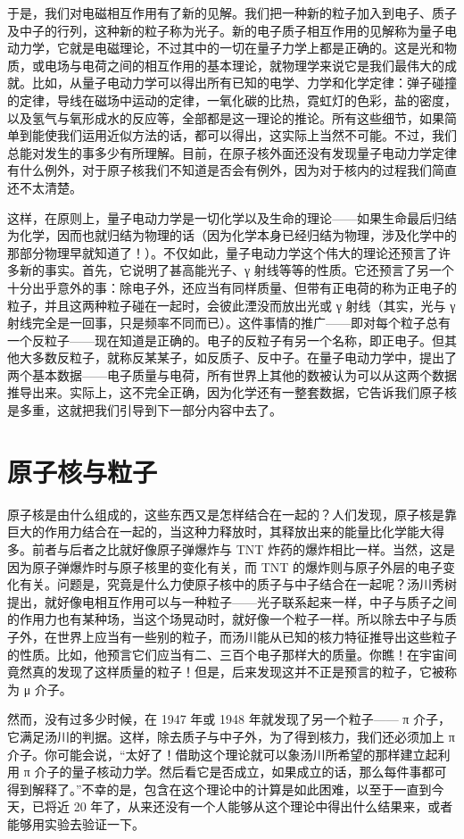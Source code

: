 \documentclass[11pt,oneside]{book}
\begin{document}
\begin{common-format}
于是，我们对电磁相互作用有了新的见解。我们把一种新的粒子加入到电子、质子及中子的行列，这种新的粒子称为光子。新的电子质子相互作用的见解称为量子电动力学，它就是电磁理论，不过其中的一切在量子力学上都是正确的。这是光和物质，或电场与电荷之间的相互作用的基本理论，就物理学来说它是我们最伟大的成就。比如，从量子电动力学可以得出所有已知的电学、力学和化学定律：弹子碰撞的定律，导线在磁场中运动的定律，一氧化碳的比热，霓虹灯的色彩，盐的密度，以及氢气与氧形成水的反应等，全部都是这一理论的推论。所有这些细节，如果简单到能使我们运用近似方法的话，都可以得出，这实际上当然不可能。不过，我们总能对发生的事多少有所理解。目前，在原子核外面还没有发现量子电动力学定律有什么例外，对于原子核我们不知道是否会有例外，因为对于核内的过程我们简直还不太清楚。

这样，在原则上，量子电动力学是一切化学以及生命的理论——如果生命最后归结为化学，因而也就归结为物理的话（因为化学本身已经归结为物理，涉及化学中的那部分物理早就知道了！）。不仅如此，量子电动力学这个伟大的理论还预言了许多新的事实。首先，它说明了甚高能光子、γ 射线等等的性质。它还预言了另一个十分出乎意外的事：除电子外，还应当有同样质量、但带有正电荷的称为正电子的粒子，并且这两种粒子碰在一起时，会彼此湮没而放出光或 γ 射线（其实，光与 γ 射线完全是一回事，只是频率不同而已）。这件事情的推广——即对每个粒子总有一个反粒子——现在知道是正确的。电子的反粒子有另一个名称，即正电子。但其他大多数反粒子，就称反某某子，如反质子、反中子。在量子电动力学中，提出了两个基本数据——电子质量与电荷，所有世界上其他的数被认为可以从这两个数据推导出来。实际上，这不完全正确，因为化学还有一整套数据，它告诉我们原子核是多重，这就把我们引导到下一部分内容中去了。


\section{原子核与粒子}
原子核是由什么组成的，这些东西又是怎样结合在一起的？人们发现，原子核是靠巨大的作用力结合在一起的，当这种力释放时，其释放出来的能量比化学能大得多。前者与后者之比就好像原子弹爆炸与 TNT 炸药的爆炸相比一样。当然，这是因为原子弹爆炸时与原子核里的变化有关，而 TNT 的爆炸则与原子外层的电子变化有关。问题是，究竟是什么力使原子核中的质子与中子结合在一起呢？汤川秀树提出，就好像电相互作用可以与一种粒子——光子联系起来一样，中子与质子之间的作用力也有某种场，当这个场晃动时，就好像一个粒子一样。所以除去中子与质子外，在世界上应当有一些别的粒子，而汤川能从已知的核力特征推导出这些粒子的性质。比如，他预言它们应当有二、三百个电子那样大的质量。你瞧！在宇宙间竟然真的发现了这样质量的粒子！但是，后来发现这并不正是预言的粒子，它被称为 μ 介子。

然而，没有过多少时候，在 1947 年或 1948 年就发现了另一个粒子—— π 介子，它满足汤川的判据。这样，除去质子与中子外，为了得到核力，我们还必须加上 π 介子。你可能会说，“太好了！借助这个理论就可以象汤川所希望的那样建立起利用 π 介子的量子核动力学。然后看它是否成立，如果成立的话，那么每件事都可得到解释了。”不幸的是，包含在这个理论中的计算是如此困难，以至于一直到今天，已将近 20 年了，从来还没有一个人能够从这个理论中得出什么结果来，或者能够用实验去验证一下。


\end{common-format}
\end{document}
